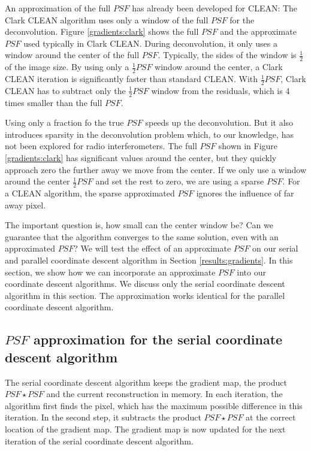 An approximation of the full $PSF$ has already been developed for CLEAN: The Clark CLEAN algorithm \cite{clark1980efficient} uses only a window of the full $PSF$ for the deconvolution. Figure \ref{gradients:clark} shows the full $PSF$ and the approximate $PSF$ used typically in Clark CLEAN. During deconvolution, it only uses a window around the center of the full $PSF$. Typically, the sides of the window is $\frac{1}{2}$ of the image size. By using only a $\frac{1}{2} PSF$ window around the center, a Clark CLEAN iteration is significantly faster than standard CLEAN. With $\frac{1}{2} PSF$, Clark CLEAN has to subtract only the $\frac{1}{2} PSF$ window from the residuals, which is 4 times smaller than the full $PSF$.

Using only a fraction fo the true $PSF$ speeds up the deconvolution. But it also introduces sparsity in the deconvolution problem which, to our knowledge, has not been explored for radio interferometers. The full $PSF$ shown in Figure \ref{gradients:clark} has significant values around the center, but they quickly approach zero the further away we move from the center. If we only use a window around the center $\frac{1}{2} PSF$ and set the rest to zero, we are using a sparse $PSF$. For a CLEAN algorithm, the sparse approximated $PSF$ ignores the influence of far away pixel.

The important question is, how small can the center window be? Can we guarantee that the algorithm converges to the same solution, even with an approximated $PSF$? We will test the effect of an approximate $PSF$ on our serial and parallel coordinate descent algorithm in Section \ref{results:gradients}. In this section, we show how we can incorporate an approximate $PSF$ into our coordinate descent algorithms. We discuss only the serial coordinate descent algorithm in this section. The approximation works identical for the parallel coordinate descent algorithm.


\subsection{$PSF$ approximation for the serial coordinate descent algorithm}
The serial coordinate descent algorithm keeps the gradient map, the product $PSF \star PSF$ and the current reconstruction in memory. In each iteration, the algorithm first finds the pixel, which has the maximum possible difference in this iteration. In the second step, it subtracts the product $PSF \star PSF$ at the correct location of the gradient map. The gradient map is now updated for the next iteration of the serial coordinate descent algorithm.

